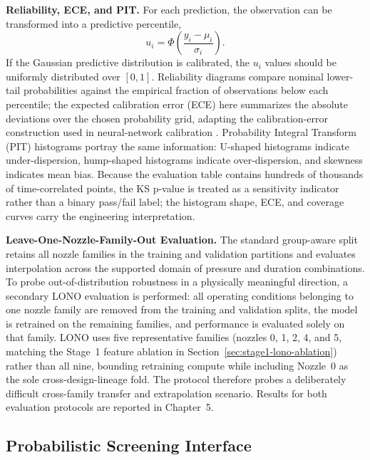 \textbf{Reliability, ECE, and PIT.} For each prediction, the observation can be transformed into a predictive percentile,
\[
u_i=\Phi\!\left(\frac{y_i-\mu_i}{\sigma_i}\right).
\]
If the Gaussian predictive distribution is calibrated, the \(u_i\) values should be uniformly distributed over \([0,1]\). Reliability diagrams compare nominal lower-tail probabilities against the empirical fraction of observations below each percentile; the expected calibration error (ECE) here summarizes the absolute deviations over the chosen probability grid, adapting the calibration-error construction used in neural-network calibration \cite{Guo2017Calibration}. Probability Integral Transform (PIT) histograms portray the same information: U-shaped histograms indicate under-dispersion, hump-shaped histograms indicate over-dispersion, and skewness indicates mean bias. Because the evaluation table contains hundreds of thousands of time-correlated points, the KS p-value is treated as a sensitivity indicator rather than a binary pass/fail label; the histogram shape, ECE, and coverage curves carry the engineering interpretation.

\textbf{Leave-One-Nozzle-Family-Out Evaluation.} The standard group-aware split retains all nozzle families in the training and validation partitions and evaluates interpolation across the supported domain of pressure and duration combinations. To probe out-of-distribution robustness in a physically meaningful direction, a secondary LONO evaluation is performed: all operating conditions belonging to one nozzle family are removed from the training and validation splits, the model is retrained on the remaining families, and performance is evaluated solely on that family. LONO uses five representative families (nozzles 0, 1, 2, 4, and 5, matching the Stage~1 feature ablation in Section~\ref{sec:stage1-lono-ablation}) rather than all nine, bounding retraining compute while including Nozzle~0 as the sole cross-design-lineage fold. The protocol therefore probes a deliberately difficult cross-family transfer and extrapolation scenario. Results for both evaluation protocols are reported in Chapter~5.

\subsection{Probabilistic Screening Interface}
\label{sec:screening-interface-en}

